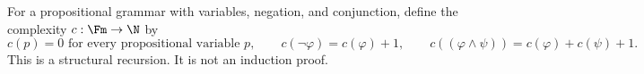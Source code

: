 \begin{example}
For a propositional grammar with variables, negation, and conjunction, define
the complexity \(c:\Fm\to\N\) by
\[
  c(p)=0\text{ for every propositional variable }p,\qquad
  c(\neg\varphi)=c(\varphi)+1,\qquad
  c((\varphi\land\psi))=c(\varphi)+c(\psi)+1.
\]
This is a structural recursion.  It is not an induction proof.
\end{example}

